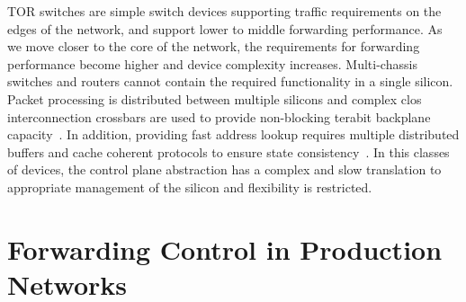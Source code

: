 TOR switches are simple switch devices supporting traffic requirements on the
edges of the network, and support lower to middle forwarding performance. As we
move closer to the core of the network, the requirements for forwarding
performance become higher and device complexity increases. Multi-chassis
switches and routers cannot contain the required functionality in a single
silicon. Packet processing is distributed between multiple silicons and complex
clos interconnection crossbars are used to provide non-blocking terabit
backplane capacity~\cite{juniper_t_series}. In addition, providing fast address lookup
requires multiple distributed buffers and cache coherent protocols to ensure
state consistency~\cite{cisco_cef}. In this classes of devices, the control 
plane abstraction has a complex and slow translation to appropriate management 
of the silicon and flexibility is restricted.  


\section{Forwarding Control in Production Networks} \label{sec:background:netcontrol}

% 


